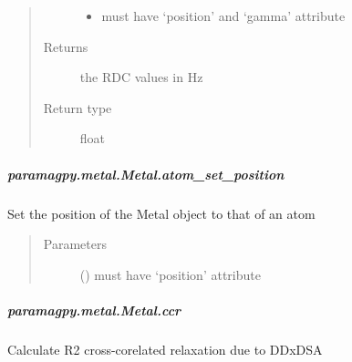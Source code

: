 \documentclass[a4paper,10pt,english]{sphinxmanual}
\begin{document}
\begin{fulllineitems}
\begin{fulllineitems}
\begin{fulllineitems}
\begin{quote}
\begin{description}
\begin{itemize}
\item {} 
 \textendash{} must have ‘position’ and ‘gamma’ attribute

\end{itemize}

\item[{Returns}] \leavevmode
{} \textendash{} the RDC values in Hz

\item[{Return type}] \leavevmode
float

\end{description}\end{quote}

\end{fulllineitems}



\subparagraph{paramagpy.metal.Metal.atom\_set\_position}
\label{\detokenize{reference/generated/paramagpy.metal.Metal.atom_set_position:paramagpy-metal-metal-atom-set-position}}\label{\detokenize{reference/generated/paramagpy.metal.Metal.atom_set_position::doc}}

\begin{fulllineitems}
\label{\detokenize{reference/generated/paramagpy.metal.Metal.atom_set_position:paramagpy.metal.Metal.atom_set_position}}
Set the position of the Metal object to that of an atom
\begin{quote}\begin{description}
\item[{Parameters}] \leavevmode
{} () \textendash{} must have ‘position’ attribute

\end{description}\end{quote}

\end{fulllineitems}



\subparagraph{paramagpy.metal.Metal.ccr}
\label{\detokenize{reference/generated/paramagpy.metal.Metal.ccr:paramagpy-metal-metal-ccr}}\label{\detokenize{reference/generated/paramagpy.metal.Metal.ccr::doc}}

\begin{fulllineitems}
\label{\detokenize{reference/generated/paramagpy.metal.Metal.ccr:paramagpy.metal.Metal.ccr}}
Calculate R2 cross-corelated relaxation due to DDxDSA


\end{fulllineitems}
\end{fulllineitems}
\end{fulllineitems}
\end{document}
